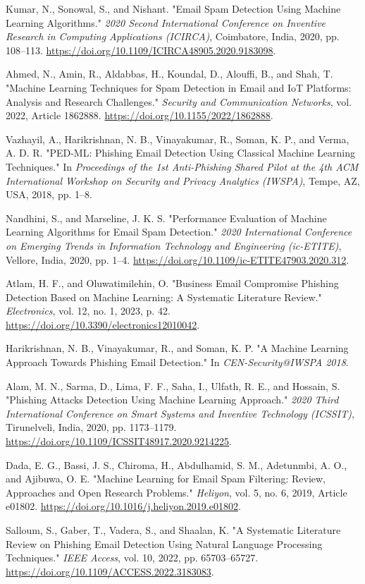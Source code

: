 \begin{thebibliography}{10}
Kumar, N., Sonowal, S., and Nishant. "Email Spam Detection Using Machine Learning Algorithms." 
\textit{2020 Second International Conference on Inventive Research in Computing Applications (ICIRCA)}, Coimbatore, India, 2020, pp. 108--113. 
\url{https://doi.org/10.1109/ICIRCA48905.2020.9183098}.

Ahmed, N., Amin, R., Aldabbas, H., Koundal, D., Alouffi, B., and Shah, T. "Machine Learning Techniques for Spam Detection in Email and IoT Platforms: Analysis and Research Challenges." 
\textit{Security and Communication Networks}, vol. 2022, Article 1862888. 
\url{https://doi.org/10.1155/2022/1862888}.
    
Vazhayil, A., Harikrishnan, N. B., Vinayakumar, R., Soman, K. P., and Verma, A. D. R. "PED-ML: Phishing Email Detection Using Classical Machine Learning Techniques." 
In \textit{Proceedings of the 1st Anti-Phishing Shared Pilot at the 4th ACM International Workshop on Security and Privacy Analytics (IWSPA)}, Tempe, AZ, USA, 2018, pp. 1--8.

Nandhini, S., and Marseline, J. K. S. "Performance Evaluation of Machine Learning Algorithms for Email Spam Detection." 
\textit{2020 International Conference on Emerging Trends in Information Technology and Engineering (ic-ETITE)}, Vellore, India, 2020, pp. 1--4. 
\url{https://doi.org/10.1109/ic-ETITE47903.2020.312}.

Atlam, H. F., and Oluwatimilehin, O. "Business Email Compromise Phishing Detection Based on Machine Learning: A Systematic Literature Review." 
\textit{Electronics}, vol. 12, no. 1, 2023, p. 42. 
\url{https://doi.org/10.3390/electronics12010042}.

Harikrishnan, N. B., Vinayakumar, R., and Soman, K. P. "A Machine Learning Approach Towards Phishing Email Detection." 
In \textit{CEN-Security@IWSPA 2018}.

Alam, M. N., Sarma, D., Lima, F. F., Saha, I., Ulfath, R. E., and Hossain, S. "Phishing Attacks Detection Using Machine Learning Approach." 
\textit{2020 Third International Conference on Smart Systems and Inventive Technology (ICSSIT)}, Tirunelveli, India, 2020, pp. 1173--1179. 
\url{https://doi.org/10.1109/ICSSIT48917.2020.9214225}.

Dada, E. G., Bassi, J. S., Chiroma, H., Abdulhamid, S. M., Adetunmbi, A. O., and Ajibuwa, O. E. "Machine Learning for Email Spam Filtering: Review, Approaches and Open Research Problems." 
\textit{Heliyon}, vol. 5, no. 6, 2019, Article e01802. 
\url{https://doi.org/10.1016/j.heliyon.2019.e01802}.

Salloum, S., Gaber, T., Vadera, S., and Shaalan, K. "A Systematic Literature Review on Phishing Email Detection Using Natural Language Processing Techniques." 
\textit{IEEE Access}, vol. 10, 2022, pp. 65703--65727. 
\url{https://doi.org/10.1109/ACCESS.2022.3183083}.
    
\end{thebibliography}